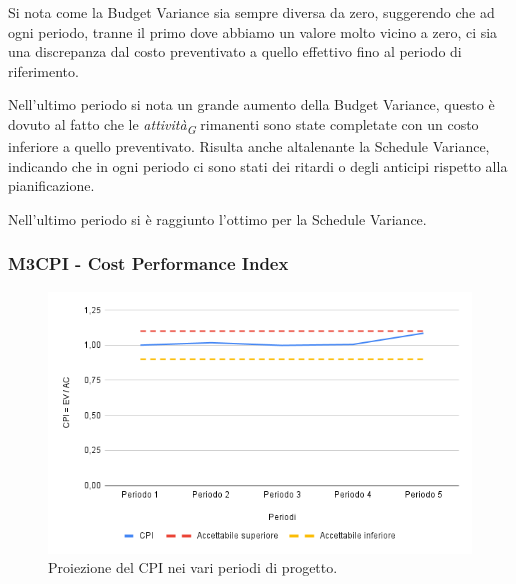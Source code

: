 \vspace{0.2cm}

Si nota come la Budget Variance sia sempre diversa da zero, suggerendo che ad ogni periodo, tranne il primo dove abbiamo un valore molto vicino a zero, ci sia una discrepanza dal costo preventivato a quello effettivo fino al periodo di riferimento. 

\vspace{0.2cm}

Nell'ultimo periodo si nota un grande aumento della Budget Variance, questo è dovuto al fatto che le \textit{attività}\textsubscript{\textit{G}} rimanenti sono state completate con un costo inferiore a quello preventivato. 
Risulta anche altalenante la Schedule Variance, indicando che in ogni periodo ci sono stati dei ritardi o degli anticipi rispetto alla pianificazione.

\vspace{0.2cm}

Nell'ultimo periodo si è raggiunto l'ottimo per la Schedule Variance. 

\subsubsection{M3CPI - Cost Performance Index}

\vspace{0.3cm}

\begin{figure}[H]
    \centering
    \includegraphics[width=1\textwidth]{../Images/PianoDiQualifica/M3CPI.png}
    \caption{Proiezione del CPI nei vari periodi di progetto.}
    \label{fig:6}
\end{figure}

\vspace{0.2cm}

